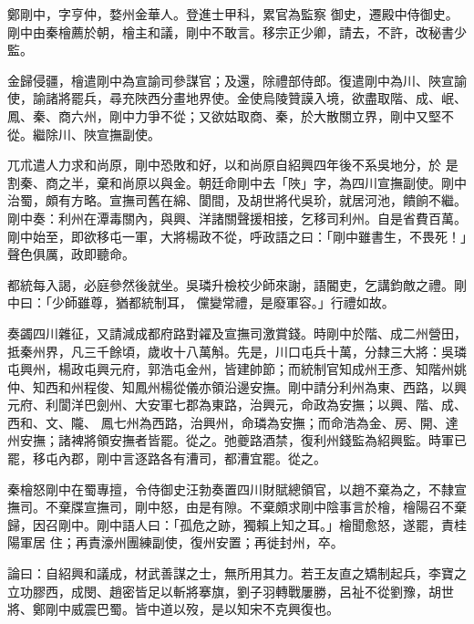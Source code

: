 \begin{pinyinscope}
 鄭剛中，字亨仲，婺州金華人。登進士甲科，累官為監察
 御史，遷殿中侍御史。剛中由秦檜薦於朝，檜主和議，剛中不敢言。移宗正少卿，請去，不許，改秘書少監。



 金歸侵疆，檜遣剛中為宣諭司參謀官；及還，除禮部侍郎。復遣剛中為川、陜宣諭使，諭諸將罷兵，尋充陜西分畫地界使。金使烏陵贊謨入境，欲盡取階、成、岷、鳳、秦、商六州，剛中力爭不從；又欲姑取商、秦，於大散關立界，剛中又堅不從。繼除川、陜宣撫副使。



 兀朮遣人力求和尚原，剛中恐敗和好，以和尚原自紹興四年後不系吳地分，於
 是割秦、商之半，棄和尚原以與金。朝廷命剛中去「陜」字，為四川宣撫副使。剛中治蜀，頗有方略。宣撫司舊在綿、閬間，及胡世將代吳玠，就居河池，饋餉不繼。剛中奏：利州在潭毒關內，與興、洋諸關聲援相接，乞移司利州。自是省費百萬。剛中始至，即欲移屯一軍，大將楊政不從，呼政語之曰：「剛中雖書生，不畏死！」聲色俱厲，政即聽命。



 都統每入謁，必庭參然後就坐。吳璘升檢校少師來謝，語閽吏，乞講鈞敵之禮。剛中曰：「少師雖尊，猶都統制耳，
 儻變常禮，是廢軍容。」行禮如故。



 奏蠲四川雜征，又請減成都府路對糴及宣撫司激賞錢。時剛中於階、成二州營田，抵秦州界，凡三千餘頃，歲收十八萬斛。先是，川口屯兵十萬，分隸三大將：吳璘屯興州，楊政屯興元府，郭浩屯金州，皆建帥節；而統制官知成州王彥、知階州姚仲、知西和州程俊、知鳳州楊從儀亦領沿邊安撫。剛中請分利州為東、西路，以興元府、利閬洋巴劍州、大安軍七郡為東路，治興元，命政為安撫；以興、階、成、西和、文、隴、
 鳳七州為西路，治興州，命璘為安撫；而命浩為金、房、開、達州安撫；諸裨將領安撫者皆罷。從之。弛夔路酒禁，復利州錢監為紹興監。時軍已罷，移屯內郡，剛中言逐路各有漕司，都漕宜罷。從之。



 秦檜怒剛中在蜀專擅，令侍御史汪勃奏置四川財賦總領官，以趙不棄為之，不隸宣撫司。不棄牒宣撫司，剛中怒，由是有隙。不棄頗求剛中陰事言於檜，檜陽召不棄歸，因召剛中。剛中語人曰：「孤危之跡，獨賴上知之耳。」檜聞愈怒，遂罷，責桂陽軍居
 住；再責濠州團練副使，復州安置；再徙封州，卒。



 論曰：自紹興和議成，材武善謀之士，無所用其力。若王友直之矯制起兵，李寶之立功膠西，成閔、趙密皆足以斬將搴旗，劉子羽轉戰屢勝，呂祉不從劉豫，胡世將、鄭剛中威震巴蜀。皆中道以歿，是以知宋不克興復也。



\end{pinyinscope}